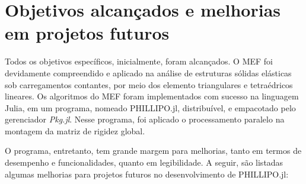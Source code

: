\chapter{Objetivos alcançados e melhorias em projetos futuros}

Todos os objetivos específicos, inicialmente, foram alcançados. O MEF foi devidamente compreendido e aplicado na análise de estruturas sólidas elásticas sob carregamentos contantes, por meio dos elemento triangulares e tetraédricos lineares. Os algoritmos do MEF foram implementados com sucesso na linguagem Julia, em um programa, nomeado PHILLIPO.jl, distribuível, e empacotado pelo gerenciador \emph{Pkg.jl}. Nesse programa, foi aplicado o processamento paralelo na montagem da matriz de rigidez global.

O programa, entretanto, tem grande margem para melhorias, tanto em termos de desempenho e funcionalidades, quanto em legibilidade. A seguir, são listadas algumas melhorias para projetos futuros no desenvolvimento de PHILLIPO.jl:

